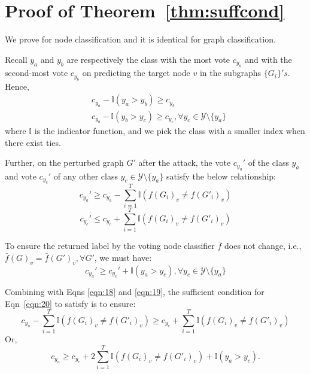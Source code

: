 \section{Proof of Theorem~\ref{thm:suffcond}}
\label{app:suffcond}

We prove for node classification and it is identical for graph classification. 

Recall $y_a$ and $y_b$ are respectively the class with the most vote $c_{y_a}$ and with the second-most vote $c_{y_b}$ on predicting the target node $v$ in the subgraphs $\{G_i\}'s$. Hence, 
\begin{align}
&    c_{y_{a}}-\mathbb{I}(y_{a}>y_{b})\geq c_{y_{b}} \label{eqn:16} \\
 &   c_{y_{b}}-\mathbb{I}(y_{b}>y_{c})\geq c_{y_{c}}, \forall y_c \in \mathcal{Y}\setminus\{y_{a}\} \label{eqn:17}
\end{align}
where $\mathbb{I}$ is the indicator function, and we pick the class with a smaller index when there exist ties. 

Further, on the perturbed graph $G'$ after the attack, the vote $c_{y_{a}}'$ of the class $y_a$ and vote $c_{y_{c}}'$ of any other class $y_{c}\in \mathcal{Y}\setminus \{y_{a}\}$ satisfy the below relationship: 
\begin{equation}
\label{eqn:18}
c_{y_{a}}'\geq c_{y_{a}} - \sum_{i=1}^{T}\mathbb{I}(f(G_{i})_v\neq f(G'_{i})_v) 
\end{equation}
\begin{equation}
\label{eqn:19}
c_{y_{c}}'\leq c_{y_{c}} + \sum_{i=1}^{T}\mathbb{I}(f(G_{i})_v\neq f(G'_{i})_v)
\end{equation}

To ensure the returned label by the voting node classifier $\bar{f}$ does not change, i.e., $\bar{f}(G)_v = \bar{f}(G')_v, \forall G'$, we must have:
\begin{equation}
\label{eqn:20}
c_{y_{a}}'\geq c_{y_c}'+\mathbb{I}(y_{a}>y_{c}),\forall y_{c}\in \mathcal{Y}\setminus \{y_{a}\}
\end{equation}

Combining with Eqns \ref{eqn:18} and \ref{eqn:19}, the sufficient condition for Eqn~\ref{eqn:20} to satisfy is to ensure: 
\begin{equation}
c_{y_{a}} - \sum_{i=1}^{T}\mathbb{I}(f(G_{i})_v\neq f(G'_{i})_v)  \geq 
c_{y_{c}} + \sum_{i=1}^{T}\mathbb{I}(f(G_{i})_v\neq f(G'_{i})_v)
\end{equation}
Or, 
\begin{equation}
c_{y_{a}}\geq c_{y_{c}} + 2\sum_{i=1}^{T}\mathbb{I}(f(G_{i})_v\neq f(G'_{i})_v)+\mathbb{I}(y_{a}>y_{c}).
\end{equation}

